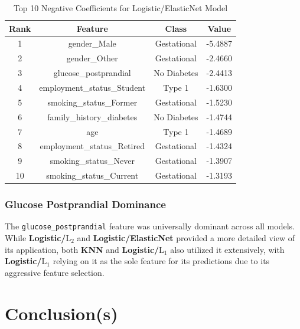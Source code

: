 \documentclass[conference]{IEEEtran}
\begin{document}
\begin{table}[h!]\centering
	\caption{Top 10 Negative Coefficients for Logistic/ElasticNet Model}
	\label{tab:elasticnet_negative_coefficients}
	\begin{tabular}{|c|c|c|c|}
		\hline
		\textbf{Rank} & \textbf{Feature} & \textbf{Class} & \textbf{Value} \\
		\hline
		1 & gender\_Male & Gestational & -5.4887 \\
		2 & gender\_Other & Gestational & -2.4660 \\
		3 & glucose\_postprandial & No Diabetes & -2.4413 \\
		4 & employment\_status\_Student & Type 1 & -1.6300 \\
		5 & smoking\_status\_Former & Gestational & -1.5230 \\
		6 & family\_history\_diabetes & No Diabetes & -1.4744 \\
		7 & age & Type 1 & -1.4689 \\
		8 & employment\_status\_Retired & Gestational & -1.4324 \\
		9 & smoking\_status\_Never & Gestational & -1.3907 \\
		10 & smoking\_status\_Current & Gestational & -1.3193 \\
		\hline
	\end{tabular}
\end{table}

\subsubsection{Glucose Postprandial Dominance}
The \texttt{glucose\_postprandial} feature was universally dominant across all models. While \textbf{Logistic/$\text{L}_2$} and \textbf{Logistic/ElasticNet} provided a more detailed view of its application, both \textbf{KNN} and \textbf{Logistic/$\text{L}_1$} also utilized it extensively, with \textbf{Logistic/$\text{L}_1$} relying on it as the sole feature for its predictions due to its aggressive feature selection.


\section{\textbf{Conclusion(s)}}
\end{document}
